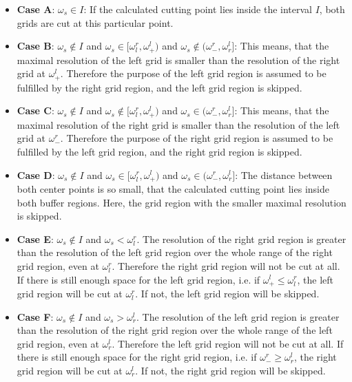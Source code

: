 \begin{itemize} %
	\item{\bf Case A}: $\omega_s \in I$: If the calculated cutting point lies inside the interval $I$, both grids are cut at this particular point.

	\item{\bf Case B}: $\omega_s \notin I$ and $\omega_s \in [\omega_l^r, \omega_+^l)$ and $\omega_s \notin (\omega_-^r, \omega_r^l]$: This means, that the maximal resolution of the left grid is smaller than the resolution of the right grid at $\omega_+^l$. Therefore the purpose of the left grid region is assumed to be fulfilled by the right grid region, and the left grid region is skipped.

	\item{\bf Case C}: $\omega_s \notin I$ and $\omega_s \notin [\omega_l^r, \omega_+^l)$ and $\omega_s \in (\omega_-^r, \omega_r^l]$: This means, that the maximal resolution of the right grid is smaller than the resolution of the left grid at $\omega_-^r$. Therefore the purpose of the right grid region is assumed to be fulfilled by the left grid region, and the right grid region is skipped.

	\item{\bf Case D}: $\omega_s \notin I$ and $\omega_s \in [\omega_l^r, \omega_+^l)$ and $\omega_s \in (\omega_-^r, \omega_r^l]$: The distance between both center points is so small, that the calculated cutting point lies inside both buffer regions. Here, the grid region with the smaller maximal resolution is skipped.

	\item{\bf Case E}:  $\omega_s \notin I$ and $\omega_s < \omega_l^r$. The resolution of the right grid region is greater than the resolution of the left grid region over the whole range of the right grid region, even at $\omega_l^r$. Therefore the right grid region will not be cut at all. If there is still enough space for the left grid region, i.e. if $\omega_+^l\leq\omega_l^r$, the left grid region will be cut at $\omega_l^r$. If not, the left grid region will be skipped.

	\item{\bf Case F}:  $\omega_s \notin I$ and $\omega_s > \omega_r^l$. The resolution of the left grid region is greater than the resolution of the right grid region over the whole range of the left grid region, even at $\omega_r^l$. Therefore the left grid region will not be cut at all. If there is still enough space for the right grid region, i.e. if $\omega_-^r \geq \omega_r^l$, the right grid region will be cut at $\omega_r^l$. If not, the right grid region will be skipped.
\end{itemize}

